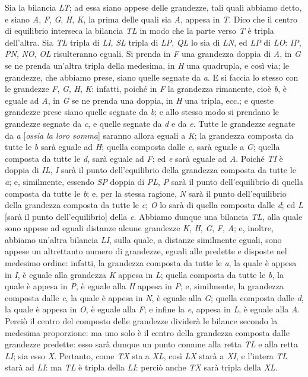 \documentclass[11pt,twoside,openany]{book}
\begin{document}
Sia la bilancia \emph{LT}; ad essa siano appese delle grandezze, tali quali abbiamo detto, e siano \emph{A}, \emph{F}, \emph{G}, \emph{H}, \emph{K}, la prima delle quali sia \emph{A}, appesa in \emph{T}. Dico che il centro di equilibrio interseca la bilancia \emph{TL} in modo che la parte verso \emph{T} è tripla dell'altra. Sia \emph{TL} tripla di \emph{LI}, \emph{SL} tripla di \emph{LP}, \emph{QL} lo sia di \emph{LN}, ed \emph{LP} di \emph{LO}: \emph{IP}, \emph{PN}, \emph{NO}, \emph{OL} risulteranno eguali. Si prenda in \emph{F} una grandezza doppia di \emph{A}, in \emph{G} se ne prenda un'altra tripla della medesima, in \emph{H} una quadrupla, e così via; le grandezze, che abbiamo prese, siano quelle segnate da \emph{a}. E si faccia lo stesso con le grandezze \emph{F}, \emph{G}, \emph{H}, \emph{K}: infatti, poiché in \emph{F} la grandezza rimanente, cioè \emph{b}, è eguale ad \emph{A}, in \emph{G} se ne prenda una doppia, in \emph{H} una tripla, ecc.; e queste grandezze prese siano quelle segnate da \emph{b}; e allo stesso modo si prendano le grandezze segnate da \emph{c}, e quelle segnate da \emph{d} e da \emph{e}. Tutte le grandezze segnate da \emph{a} [\emph{ossia la loro somma}] saranno allora eguali a \emph{K}; la grandezza composta da tutte le \emph{b} sarà eguale ad \emph{H}; quella composta dalle \emph{c}, sarà eguale a \emph{G}; quella composta da tutte le \emph{d}, sarà eguale ad \emph{F}; ed \emph{e} sarà eguale ad \emph{A}. Poiché \emph{TI} è doppia di \emph{IL}, \emph{I} sarà il punto dell'equilibrio della grandezza composta da tutte le \emph{a}; e, similmente, essendo \emph{SP} doppia di \emph{PL}, \emph{P} sarà il punto dell'equilibrio di quella composta da tutte le \emph{b}; e, per la stessa ragione, \emph{N} sarà il punto dell'equilibrio della grandezza composta da tutte le \emph{c}; \emph{O} lo sarà di quella composta dalle \emph{d}; ed \emph{L} [sarà il punto dell'equilibrio] della \emph{e}. Abbiamo dunque una bilancia \emph{TL}, alla quale sono appese ad eguali distanze alcune grandezze \emph{K}, \emph{H}, \emph{G}, \emph{F}, \emph{A}; e, inoltre, abbiamo un'altra bilancia \emph{LI}, sulla quale, a distanze similmente eguali, sono appese un altrettanto numero di grandezze, eguali alle predette e disposte nel medesimo ordine: infatti, la grandezza composta da tutte le \emph{a}, la quale è appesa in \emph{I}, è eguale alla grandezza \emph{K} appesa in \emph{L}; quella composta da tutte le \emph{b}, la quale è appesa in \emph{P}, è eguale alla \emph{H} appesa in \emph{P}; e, similmente, la grandezza composta dalle \emph{c}, la quale è appesa in \emph{N}, è eguale alla \emph{G}; quella composta dalle \emph{d}, la quale è appesa in \emph{O}, è eguale alla \emph{F}; e infine la \emph{e}, appesa in \emph{L}, è eguale alla \emph{A}. Perciò il centro del composto delle grandezze dividerà le bilance secondo la medesima proporzione: ma uno solo è il centro della grandezza composta dalle grandezze predette: esso sarà dunque un punto comune alla retta \emph{TL} e alla retta \emph{LI}; sia esso \emph{X}. Pertanto, come \emph{TX} sta a \emph{XL}, così \emph{LX} starà a \emph{XI}, e l'intera \emph{TL} starà ad \emph{LI}: ma \emph{TL} è tripla della \emph{LI}: perciò anche \emph{TX} sarà tripla della \emph{XL}.
\end{document}
